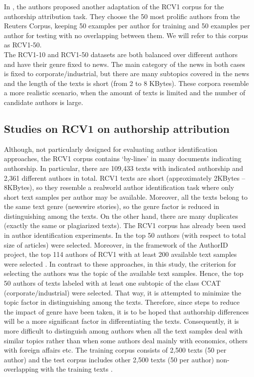 In \citet{houvardas2006n}, the authors proposed another adaptation of the RCV1 corpus for the authorship attribution task. They choose the 50 most prolific authors from the Reuters Corpus, keeping 50 examples per author for training and 50 examples per author for testing with no
overlapping between them. We will refer to this corpus as RCV1-50.\\
The RCV1-10 and RCV1-50 datasets are both balanced over different authors and have their genre fixed to news.
The main category of the news in both cases is fixed to corporate/industrial, but there are many subtopics covered in the news and the length of the texts is short (from 2 to 8 KBytes). These corpora resemble a more realistic scenario, when the amount of texts is limited and the number of candidate authors is large.

\subsection{Studies on RCV1 on authorship attribution}

Although, not particularly designed for evaluating author identification approaches, the RCV1
corpus contains ‘by-lines’ in many documents indicating authorship. In particular,
there are 109,433 texts with indicated authorship and 2,361 different authors in total.
RCV1 texts are short (approximately 2KBytes – 8KBytes), so they resemble a realworld author identification task where only short text samples per author may be available. Moreover, all the texts belong to the same text genre (newswire stories), so
the genre factor is reduced in distinguishing among the texts. On the other hand, there
are many duplicates (exactly the same or plagiarized texts).
The RCV1 corpus has already been used in author identification experiments. In
\citet{khmelev2003repetition} the top 50 authors (with respect to total size of articles) were selected. Moreover, in the framework of the AuthorID project, the top 114 authors of RCV1 with at least 200 available text samples were selected \cite{madigan2005author}. In contrast to these approaches, in this study, the criterion for selecting the authors was the topic of the available text
samples. Hence, the top 50 authors of texts labeled with at least one subtopic of the class CCAT (corporate/industrial) were selected. That way, it is attempted to minimize the topic factor in distinguishing among the texts. Therefore, since steps to reduce the impact of genre have been taken, it is to be hoped that authorship differences will be a more significant factor in differentiating the texts. Consequently, it is more difficult to distinguish among authors when all the text samples deal with similar topics rather than when some authors deal mainly with economics, others with foreign affairs etc.
The training corpus consists of 2,500 texts (50 per author) and the test corpus includes
other 2,500 texts (50 per author) non-overlapping with the training texts \cite{houvardas2006n}.

